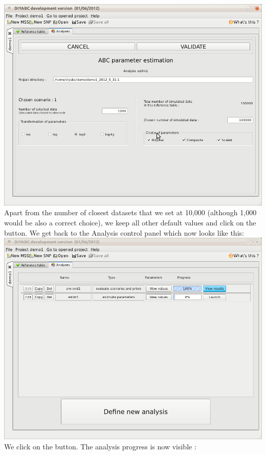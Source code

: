 \includegraphics[scale=0.35]{gui_pictures/Capture-DIYABC-36.png} \\
 
Apart from the number of closest datasets that we set at 10,000 (although 1,000 would be also a correct choice), we keep all other default values and click on the  button. We get back to the Analysis control panel which now looks like this:\\

\includegraphics[scale=0.35]{gui_pictures/Capture-DIYABC-38.png} \\

We click on the  button. The analysis progress is now visible :\\

